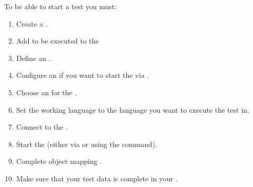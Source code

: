 % 
%
%
To be able to start a test you must:

\begin{enumerate}
\item Create a \gdsuite{} .
\item Add \gdcases{} to be executed to the \gdsuite{} 
\item Define an \gdaut{} .
\item Configure an \gdaut{}  if you want to start the \gdaut{} via \app{}.  
\item Choose an \gdaut{} for the \gdsuite{} .
\item Set the working language to the language you want to execute the test in.
\item Connect to the \gdagent{} .
\item Start the \gdaut{}  (either via \app{} or using the  command). 
\item Complete object mapping .
\item Make sure that your test data is complete in your \gdcases{}.
\end{enumerate}







